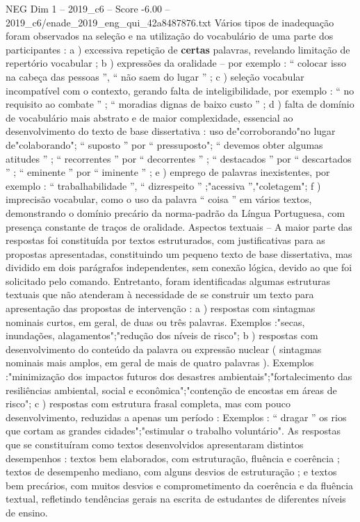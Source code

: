 \begin{textsample}{NEG Dim 1 – 2019\_c6 – Score -6.00 – 2019\_c6/enade\_2019\_eng\_qui\_42a8487876.txt}
Vários tipos de inadequação foram observados na seleção e na utilização do vocabulário de uma parte dos participantes : a ) excessiva repetição de \textbf{certas} palavras, revelando limitação de repertório vocabular ; b ) expressões da oralidade – por exemplo : “ colocar isso na cabeça das pessoas ”, “ não saem do lugar ” ; c ) seleção vocabular incompatível com o contexto, gerando falta de inteligibilidade, por exemplo : “ no requisito ao combate ” ; “ moradias dignas de baixo custo ” ; d ) falta de domínio de vocabulário mais abstrato e de maior complexidade, essencial ao desenvolvimento do texto de base dissertativa : uso de"corroborando"no lugar de"colaborando"; “ suposto ” por “ pressuposto"; “ devemos obter algumas atitudes ” ; “ recorrentes ” por “ decorrentes ” ; “ destacados ” por “ descartados ” ; “ eminente ” por “ iminente ” ; e ) emprego de palavras inexistentes, por exemplo : “ trabalhabilidade ”, “ dizrespeito ” ;"acessiva ”,"coletagem"; f ) imprecisão vocabular, como o uso da palavra “ coisa ” em vários textos, demonstrando o domínio precário da norma-padrão da Língua Portuguesa, com presença constante de traços de oralidade.
Aspectos textuais – A maior parte das respostas foi constituída por textos estruturados, com justificativas para as propostas apresentadas, constituindo um pequeno texto de base dissertativa, mas dividido em dois parágrafos independentes, sem conexão lógica, devido ao que foi solicitado pelo comando.
Entretanto, foram identificadas algumas estruturas textuais que não atenderam à necessidade de se construir um texto para apresentação das propostas de intervenção : a ) respostas com sintagmas nominais curtos, em geral, de duas ou três palavras.
Exemplos :"secas, inundações, alagamentos";"redução dos níveis de risco"; b ) respostas com desenvolvimento do conteúdo da palavra ou expressão nuclear ( sintagmas nominais mais amplos, em geral de mais de quatro palavras ).
Exemplos :"minimização dos impactos futuros dos desastres ambientais";"fortalecimento das resiliências ambiental, social e econômica";"contenção de encostas em áreas de risco"; c ) respostas com estrutura frasal completa, mas com pouco desenvolvimento, reduzidas a apenas um período : Exemplos : “ dragar ” os rios que cortam as grandes cidades";"estimular o trabalho voluntário".
As respostas que se constituíram como textos desenvolvidos apresentaram distintos desempenhos : textos bem elaborados, com estruturação, fluência e coerência ; textos de desempenho mediano, com alguns desvios de estruturação ; e textos bem precários, com muitos desvios e comprometimento da coerência e da fluência textual, refletindo tendências gerais na escrita de estudantes de diferentes níveis de ensino.

\end{textsample}
